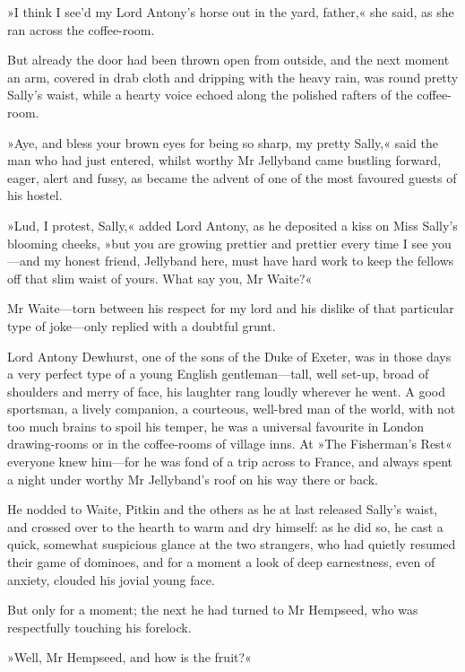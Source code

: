 »I think I see'd my Lord Antony's horse out in the yard, father,« she said, as she ran across the coffee-room.

But already the door had been thrown open from outside, and the next moment an arm, covered in drab cloth and dripping with the heavy rain, was round pretty Sally's waist, while a hearty voice echoed along the polished rafters of the coffee-room.

»Aye, and bless your brown eyes for being so sharp, my pretty Sally,« said the man who had just entered, whilst worthy Mr Jellyband came bustling forward, eager, alert and fussy, as became the advent of one of the most favoured guests of his hostel.

»Lud, I protest, Sally,« added Lord Antony, as he deposited a kiss on Miss Sally's blooming cheeks, »but you are growing prettier and prettier every time I see you\allowbreak---\allowbreak and my honest friend, Jellyband here, must have hard work to keep the fellows off that slim waist of yours. What say you, Mr Waite?«

Mr Waite\allowbreak---\allowbreak torn between his respect for my lord and his dislike of that particular type of joke\allowbreak---\allowbreak only replied with a doubtful grunt.

Lord Antony Dewhurst, one of the sons of the Duke of Exeter, was in those days a very perfect type of a young English gentleman\allowbreak---\allowbreak tall, well set-up, broad of shoulders and merry of face, his laughter rang loudly wherever he went. A good sportsman, a lively companion, a courteous, well-bred man of the world, with not too much brains to spoil his temper, he was a universal favourite in London drawing-rooms or in the coffee-rooms of village inns. At »The Fisherman's Rest« everyone knew him\allowbreak---\allowbreak for he was fond of a trip across to France, and always spent a night under worthy Mr Jellyband's roof on his way there or back.

He nodded to Waite, Pitkin and the others as he at last released Sally's waist, and crossed over to the hearth to warm and dry himself: as he did so, he cast a quick, somewhat suspicious glance at the two strangers, who had quietly resumed their game of dominoes, and for a moment a look of deep earnestness, even of anxiety, clouded his jovial young face.

But only for a moment; the next he had turned to Mr Hempseed, who was respectfully touching his forelock.

»Well, Mr Hempseed, and how is the fruit?«

